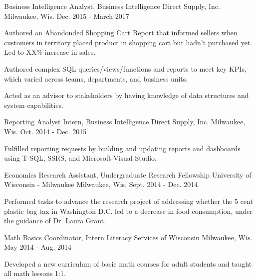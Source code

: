 \begin{cventries}
  \cventry
    {Business Intelligence Analyst, Business Intelligence} %
    {Direct Supply, Inc.} %
    {Milwaukee, Wis.} %
    {Dec. 2015 - March 2017} %
    {
      \begin{cvitems} %
        \item {Authored an Abandonded Shopping Cart Report that informed sellers when customers in territory placed product in shopping cart but hadn't purchased yet. Led to XX\% increase in sales.}
        \item {Authored complex SQL queries/views/functions and reports to meet key KPIs, which varied across teams, departments, and business units.}
        \item {Acted as an advisor to stakeholders by having knowledge of data structures and system capabilities.}
      \end{cvitems}
    }

  \cventry
    {Reporting Analyst Intern, Business Intelligence} %
    {Direct Supply, Inc.} %
    {Milwaukee, Wis.} %
    {Oct. 2014 - Dec. 2015} %
    {
      \begin{cvitems} %
        \item {Fulfilled reporting requests by building and updating reports and dashboards using T-SQL, SSRS, and Microsoft Visual Studio.}
      \end{cvitems}
    }

  \cventry
    {Economics Research Assistant, Undergraduate Research Fellowship} %
    {University of Wisconsin - Milwaukee} %
    {Milwaukee, Wis.} %
    {Sept. 2014 - Dec. 2014} %
    {
      \begin{cvitems} %
        \item {Performed tasks to advance the research project of addressing whether the 5 cent plastic bag tax in Washington D.C. led to a decrease in food consumption, under the guidance of Dr. Laura Grant.}
      \end{cvitems}
    }

  \cventry
    {Math Basics Coordinator, Intern} %
    {Literacy Services of Wisconsin} %
    {Milwaukee, Wis.} %
    {May 2014 - Aug. 2014} %
    {
      \begin{cvitems} %
        \item {Developed a new curriculum of basic math courses for adult students and taught all math lessons 1:1.}
      \end{cvitems}
    }
\end{cventries}